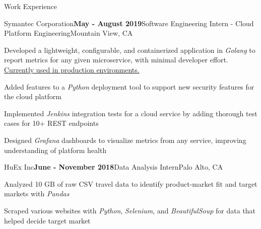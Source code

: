 \documentclass[margin,centered]{resume} %
\begin{document}
\begin{rSection}{Work Experience}

	\begin{rSubsection}{Symantec Corporation}{\textbf{May - August 2019}}{Software Engineering Intern - Cloud Platform Engineering}{Mountain View, CA}
		\item Developed a lightweight, configurable, and containerized application in \textit{Golang} to report metrics for any given microservice, with minimal developer effort. \underline{Currently used in production environments.}
		\item Added features to a \textit{Python} deployment tool to support new security features for the cloud platform
		\item Implemented \textit{Jenkins} integration tests for a cloud service by adding thorough test cases for 10+ REST endpoints
		\item Designed \textit{Grafana} dashboards to visualize metrics from any service, improving understanding of platform health
	\end{rSubsection}

	\begin{rSubsection}{HuEx Inc}{\textbf{June - November 2018}}{Data Analysis Intern}{Palo Alto, CA}
		\item Analyzed 10 GB of raw CSV travel data to identify product-market fit and target markets with \textit{Pandas}
		\item Scraped various websites with \textit{Python}, \textit{Selenium}, and \textit{BeautifulSoup} for data that helped decide target market
	\end{rSubsection}

\end{rSection}
\end{document}
